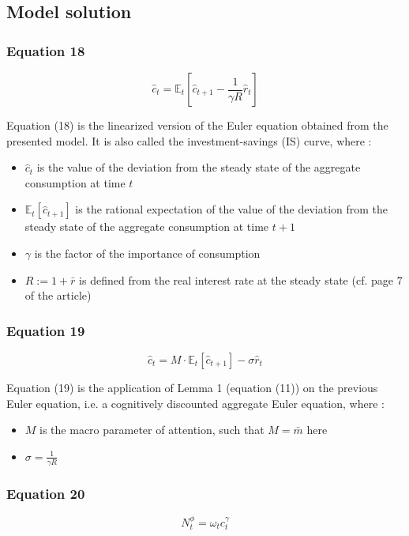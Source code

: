 \documentclass{article}
\begin{document}
\subsection{Model solution}

\subsubsection*{Equation 18}
\begin{equation}
    \hat{c}_{t}=\mathbb{E}_{t}\left[\hat{c}_{t+1}-\frac{1}{\gamma R}\hat{r}_{t}\right]
\end{equation}

Equation (18) is the linearized version of the Euler equation obtained from the presented model. It is also called the investment-savings (IS) curve, where : 
\begin{itemize}
    \item $\hat{c}_{t}$ is the value of the deviation from the steady state of the aggregate consumption at time $t$
    \item $\mathbb{E}_{t}\left[\hat{c}_{t+1}\right]$ is the rational expectation of the value of the deviation from the steady state of the aggregate consumption at time $t+1$
    \item $\gamma$ is the factor of the importance of consumption
    \item $R:=1+\bar{r}$ is defined from the real interest rate at the steady state (cf. page 7 of the article)
\end{itemize}

\subsubsection*{Equation 19}
\begin{equation}
    \hat{c}_{t}=M\cdot\mathbb{E}_{t}\left[\hat{c}_{t+1}\right]-\sigma\hat{r}_{t}
\end{equation}

Equation (19) is the application of Lemma 1 (equation (11)) on the previous Euler equation, i.e. a cognitively discounted aggregate Euler equation, where : 
\begin{itemize}
    \item $M$ is the macro parameter of attention, such that $M=\bar{m}$ here
    \item $\sigma=\frac{1}{\gamma R}$
\end{itemize}

\subsubsection*{Equation 20}
\begin{equation}
    N^{\phi}_{t}=\omega_{t}c_{t}^{\gamma}
\end{equation}
\end{document}
